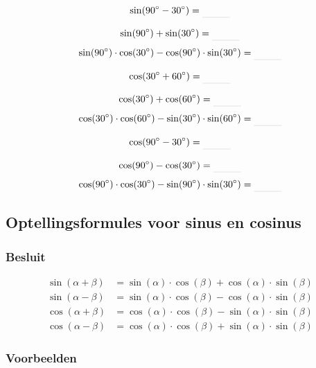 \documentclass[a4paper,12pt]{article}
\begin{document}
\begin{minipage}{0.4\textwidth}
  $$\sin(90\degree - 30\degree)=\arule{1cm}$$
\end{minipage}
\begin{minipage}{0.5\textwidth}
  $$\sin(90\degree) + \sin(30\degree)=\arule{1cm}$$
  $$\sin(90\degree)\cdot\cos(30\degree)-\cos(90\degree)\cdot\sin(30\degree)=\arule{1cm}$$
\end{minipage}

\begin{minipage}{0.4\textwidth}
  $$\cos(30\degree + 60\degree)=\arule{1cm}$$
\end{minipage}
\begin{minipage}{0.5\textwidth}
  $$\cos(30\degree) + \cos(60\degree)=\arule{1cm}$$
  $$\cos(30\degree)\cdot\cos(60\degree)-\sin(30\degree)\cdot\sin(60\degree)=\arule{1cm}$$
\end{minipage}

\begin{minipage}{0.4\textwidth}
  $$\cos(90\degree - 30\degree)=\arule{1cm}$$
\end{minipage}
\begin{minipage}{0.5\textwidth}
  $$\cos(90\degree) - \cos(30\degree)=\arule{1cm}$$
  $$\cos(90\degree)\cdot\cos(30\degree)-\sin(90\degree)\cdot\sin(30\degree)=\arule{1cm}$$
\end{minipage}



\subsection{Optellingsformules voor sinus en cosinus}

\subsubsection*{Besluit}
\begin{align*}
  \sin(\alpha + \beta)&=\sin(\alpha)\cdot \cos(\beta)+\cos(\alpha)\cdot \sin(\beta)\\
  \sin(\alpha - \beta)&=\sin(\alpha)\cdot \cos(\beta)-\cos(\alpha)\cdot \sin(\beta)\\
  \cos(\alpha + \beta)&=\cos(\alpha)\cdot \cos(\beta)-\sin(\alpha)\cdot \sin(\beta)\\
  \cos(\alpha - \beta)&=\cos(\alpha)\cdot \cos(\beta)+\sin(\alpha)\cdot \sin(\beta)
\end{align*}


\subsubsection*{Voorbeelden}
\end{document}
